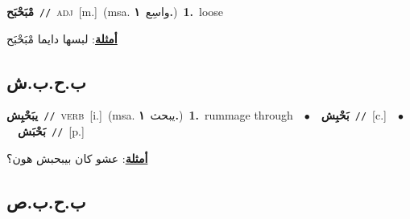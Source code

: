 \documentclass[10pt,a4paper,twoside]{article} %
\begin{document}
\begin{multicols}{2}
{{{{{\setlength\topsep{0pt}\textbf{\foreignlanguage{arabic}{مْبَحْبَح}}\ {\color{gray}\texttt{//}\color{black}}\ \textsc{adj}\ [m.]\ \color{gray}(msa. \foreignlanguage{arabic}{واسِع}~\foreignlanguage{arabic}{\textbf{١.}})\color{black}\ \textbf{1.}~loose\  \begin{flushright}\color{gray}\foreignlanguage{arabic}{\textbf{\underline{\foreignlanguage{arabic}{أمثلة}}}: لبسها دايما مْبَحْبَح}\end{flushright}\color{black}} \vspace{2mm}

\vspace{-3mm}
\subsection*{\color{blue}\foreignlanguage{arabic}{ب.ح.ب.ش}\color{blue}{}} 

{\setlength\topsep{0pt}\textbf{\foreignlanguage{arabic}{يبَحْبِش}}\ {\color{gray}\texttt{//}\color{black}}\ \textsc{verb}\ [i.]\ \color{gray}(msa. \foreignlanguage{arabic}{يبحث}~\foreignlanguage{arabic}{\textbf{١.}})\color{black}\ \textbf{1.}~rummage through\ \ $\bullet$\ \ \setlength\topsep{0pt}\textbf{\foreignlanguage{arabic}{بَحْبِش}}\ {\color{gray}\texttt{//}\color{black}}\ [c.]\ \ $\bullet$\ \ \setlength\topsep{0pt}\textbf{\foreignlanguage{arabic}{بَحْبَش}}\ {\color{gray}\texttt{//}\color{black}}\ [p.]\  \begin{flushright}\color{gray}\foreignlanguage{arabic}{\textbf{\underline{\foreignlanguage{arabic}{أمثلة}}}: عشو كان بيبحبش هون؟}\end{flushright}\color{black}} \vspace{2mm}

\vspace{-3mm}
\subsection*{\color{blue}\foreignlanguage{arabic}{ب.ح.ب.ص}\color{blue}{}} 

}}}}
\end{multicols}
\end{document}
